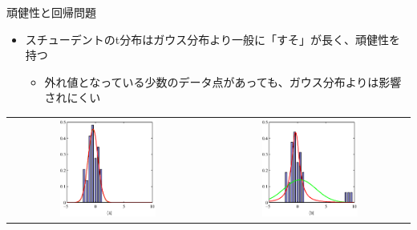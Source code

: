\begin{frame}{頑健性と回帰問題}
 \begin{itemize}
  \item スチューデントのt分布はガウス分布より一般に「すそ」が長く、\alert{頑健性}を持つ
        \begin{itemize}
         \item 外れ値となっている少数のデータ点があっても、ガウス分布よりは影響されにくい
        \end{itemize}
 \end{itemize}
        \begin{tabular}[tb]{cc}
         \includegraphics[width=0.5\textwidth]{./figure/Figure2.16a.eps}
         &
         \includegraphics[width=0.5\textwidth]{./figure/Figure2.16b.eps}
        \end{tabular}
\end{frame}

